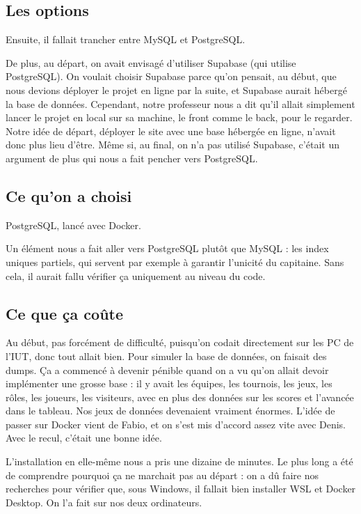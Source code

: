 \documentclass[11pt,a4paper]{article}
\begin{document}
\subsection*{Les options}

Ensuite, il fallait trancher entre MySQL et PostgreSQL.

De plus, au départ, on avait envisagé d'utiliser Supabase (qui utilise PostgreSQL). On voulait choisir Supabase parce qu'on pensait, au début, que nous devions déployer le projet en ligne par la suite, et Supabase aurait hébergé la base de données. Cependant, notre professeur nous a dit qu'il allait simplement lancer le projet en local sur sa machine, le front comme le back, pour le regarder. Notre idée de départ, déployer le site avec une base hébergée en ligne, n'avait donc plus lieu d'être. Même si, au final, on n'a pas utilisé Supabase, c'était un argument de plus qui nous a fait pencher vers PostgreSQL.

\subsection*{Ce qu'on a choisi}

PostgreSQL, lancé avec Docker.

Un élément nous a fait aller vers PostgreSQL plutôt que MySQL : les index uniques partiels, qui servent par exemple à garantir l'unicité du capitaine. Sans cela, il aurait fallu vérifier ça uniquement au niveau du code.

\subsection*{Ce que ça coûte}

Au début, pas forcément de difficulté, puisqu'on codait directement sur les PC de l'IUT, donc tout allait bien. Pour simuler la base de données, on faisait des dumps. Ça a commencé à devenir pénible quand on a vu qu'on allait devoir implémenter une grosse base : il y avait les équipes, les tournois, les jeux, les rôles, les joueurs, les visiteurs, avec en plus des données sur les scores et l'avancée dans le tableau. Nos jeux de données devenaient vraiment énormes. L'idée de passer sur Docker vient de Fabio, et on s'est mis d'accord assez vite avec Denis. Avec le recul, c'était une bonne idée.

L'installation en elle-même nous a pris une dizaine de minutes. Le plus long a été de comprendre pourquoi ça ne marchait pas au départ : on a dû faire nos recherches pour vérifier que, sous Windows, il fallait bien installer WSL et Docker Desktop. On l'a fait sur nos deux ordinateurs.
\end{document}
